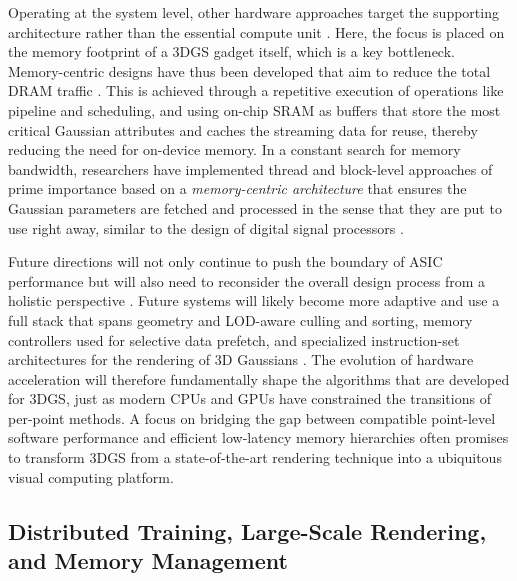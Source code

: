 \documentclass[11pt,a4paper]{article}
\begin{document}
Operating at the system level, other hardware approaches target the supporting architecture rather than the essential compute unit \cite{arxiv:2401.03890v2}. Here, the focus is placed on the memory footprint of a 3DGS gadget itself, which is a key bottleneck. Memory-centric designs have thus been developed that aim to reduce the total DRAM traffic \cite{arxiv:2401.03890v2}. This is achieved through a repetitive execution of operations like pipeline and scheduling, and using on-chip SRAM as buffers that store the most critical Gaussian attributes and caches the streaming data for reuse, thereby reducing the need for on-device memory. In a constant search for memory bandwidth, researchers have implemented thread and block-level approaches of prime importance based on a \emph{memory-centric architecture} that ensures the Gaussian parameters are fetched and processed in the sense that they are put to use right away, similar to the design of digital signal processors \cite{arxiv:2401.03890v2}.

Future directions will not only continue to push the boundary of ASIC performance but will also need to reconsider the overall design process from a holistic perspective \cite{arxiv:2401.03890v2}. Future systems will likely become more adaptive and use a full stack that spans geometry and LOD-aware culling and sorting, memory controllers used for selective data prefetch, and specialized instruction-set architectures for the rendering of 3D Gaussians \cite{arxiv:2401.03890v2}. The evolution of hardware acceleration will therefore fundamentally shape the algorithms that are developed for 3DGS, just as modern CPUs and GPUs have constrained the transitions of per-point methods. A focus on bridging the gap between compatible point-level software performance and efficient low-latency memory hierarchies often promises to transform 3DGS from a state-of-the-art rendering technique into a ubiquitous visual computing platform.


\subsection{Distributed Training, Large-Scale Rendering, and Memory Management}
\end{document}
